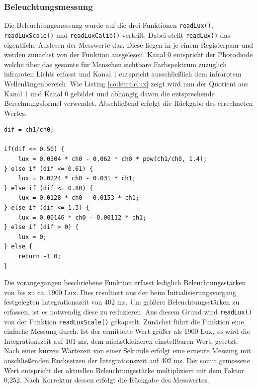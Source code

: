 \documentclass[a4paper,12pt]{scrartcl}
\begin{document}
\subsubsection{Beleuchtungsmessung}
Die Beleuchtungsmessung wurde auf die drei Funktionen \texttt{readLux()}, \texttt{readLuxScale()} und \texttt{readLuxCalib()} verteilt. Dabei stellt \texttt{readLux()} das eigentliche Auslesen der Messwerte dar. Diese liegen in je einem Registerpaar und werden zunächst von der Funktion ausgelesen. Kanal 0 entspricht der Photodiode welche über das gesamte für Menschen sichtbare Farbspektrum zuzüglich infraroten Lichts erfasst und Kanal 1 entspricht ausschließlich dem infrarotem Wellenlängenbereich. Wie Listing \ref{code:calclux} zeigt wird nun der Quotient aus Kanal 1 und Kanal 0 gebildet und abhängig davon die entsprechende Berechnungsformel verwendet. Abschließend erfolgt die Rückgabe des errechneten Wertes.


\begin{lstlisting}[captionpos=b, caption=Berechnung der Beleuchtungsstärke aus Full-Range- und IR-Photodiode, label=code:calclux]
dif = ch1/ch0;

if(dif <= 0.50) {
    lux = 0.0304 * ch0 - 0.062 * ch0 * pow(ch1/ch0, 1.4);
} else if (dif <= 0.61) {
    lux = 0.0224 * ch0 - 0.031 * ch1;
} else if (dif <= 0.80) {
    lux = 0.0128 * ch0 - 0.0153 * ch1;
} else if (dif <= 1.3) {
    lux = 0.00146 * ch0 - 0.00112 * ch1;
} else if (dif > 0) {
    lux = 0;
} else {
    return -1.0;
}
\end{lstlisting}

Die vorangegangen beschriebene Funktion erfasst lediglich Beleuchtungsstärken von bis zu ca. 1900 Lux. Dies resultiert aus der beim Initialisierungsvorgang festgelegten Integrationszeit von 402 ms. Um größere Beleuchtungsstärken zu erfassen, ist es notwendig diese zu reduzieren. Aus diesem Grund wird \texttt{readLux()} von der Funktion \texttt{readLuxScale()} gekapselt. Zunächst führt die Funktion eine einfache Messung durch. Ist der ermittelte Wert größer als 1900 Lux, so wird die Integrationszeit auf 101 ms, dem nächstkleineren einstellbaren Wert, gesetzt. Nach einer kurzen Wartezeit von einer Sekunde erfolgt eine erneute Messung mit anschließenden Rücksetzen der Integrationszeit auf 402 ms. Der somit gemessene Wert entspricht der aktuellen Beleuchtungsstärke multipliziert mit dem Faktor 0,252. Nach Korrektur dessen erfolgt die Rückgabe des Messwertes.
\end{document}
